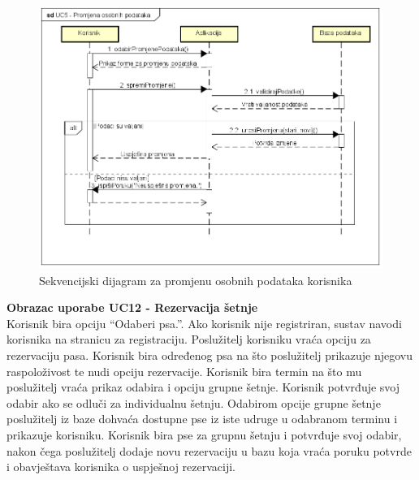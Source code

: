 				\begin{figure}[H]
					\includegraphics[scale=0.7]{dijagrami/UC5-Promjena-osobnih-podataka.PNG} 
					\centering
					\caption{Sekvencijski dijagram za promjenu osobnih podataka korisnika}
					\label{fig:uc-1}
				\end{figure}
				
				\eject
				
				\noindent \textbf{Obrazac uporabe UC12 - Rezervacija šetnje}\\
				Korisnik bira opciju “Odaberi psa.”. Ako korisnik nije registriran, sustav navodi korisnika na stranicu za registraciju. Poslužitelj korisniku vraća opciju za rezervaciju pasa. Korisnik bira određenog psa na što poslužitelj prikazuje njegovu raspoloživost te nudi opciju rezervacije. Korisnik bira termin na što mu poslužitelj vraća prikaz odabira i opciju grupne šetnje. Korisnik potvrđuje svoj odabir ako se odluči za individualnu šetnju. Odabirom opcije grupne šetnje poslužitelj iz baze dohvaća dostupne pse iz iste udruge u odabranom terminu i prikazuje korisniku. Korisnik bira pse za grupnu šetnju i potvrđuje svoj odabir, nakon čega poslužitelj dodaje novu rezervaciju u bazu koja vraća poruku potvrde i obavještava korisnika o uspješnoj rezervaciji.
				
